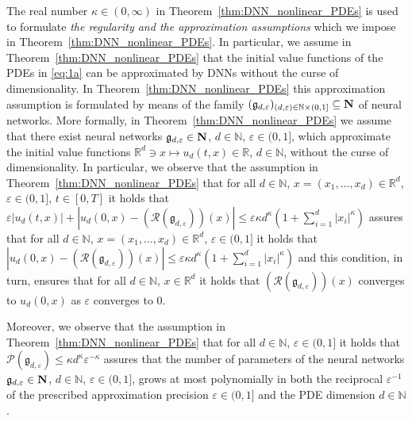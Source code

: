 \documentclass[12pt]{article}
\theoremstyle{definition}
\newcommand{\R}{\mathbb{R}}
\newcommand{\N}{\mathbb{N}}
\begin{document}
The real number $ \kappa \in (0,\infty) $ 
in Theorem~\ref{thm:DNN_nonlinear_PDEs}  
is used to formulate 
\emph{the regularity and 
the approximation assumptions} 
which we impose in Theorem~\ref{thm:DNN_nonlinear_PDEs}. 
In particular, we assume in Theorem~\ref{thm:DNN_nonlinear_PDEs} 
that the initial value functions of the PDEs in \eqref{eq:1a} 
can be approximated by DNNs without the curse of dimensionality. 
In Theorem~\ref{thm:DNN_nonlinear_PDEs} this approximation assumption 
is formulated by means of the family 
$ 
  (\mathfrak{g}_{d,\varepsilon} )_{ (d,\varepsilon) \in \N \times (0,1] } 
  \subseteq {\bf N} 
$
of neural networks. 
More formally, 
in Theorem~\ref{thm:DNN_nonlinear_PDEs} 
we assume that there exist neural networks   
$ \mathfrak{g}_{d,\varepsilon} \in {\bf N} $,
$ 
  d \in \N 
$,
$
  \varepsilon \in (0,1] 
$,
which approximate 
the initial value functions 
$ 
  \R^d \ni x \mapsto u_d( t, x ) \in \R 
$,
$ d \in \N $, 
without the curse of dimensionality. 
In particular, we observe that the assumption 
in Theorem~\ref{thm:DNN_nonlinear_PDEs} that 
for all 
$ d \in \N $, $ x = (x_1, \dots, x_d) \in \R^d $, 
$ \varepsilon \in (0,1] $, $ t \in [0,T] $ 
it holds that
$ 
  \varepsilon | u_d(t,x) | 
  + \allowbreak 
  | u_d(0,x) \allowbreak - ( \mathcal{R}(\mathfrak{g}_{d,\varepsilon}) )(x) | 
  \le \varepsilon \kappa d^\kappa (1 + \sum_{ i = 1 }^d | x_i |^\kappa ) 
$
assures that 
for all 
$ d \in \N $, $ x = (x_1, \dots, x_d) \in \R^d $, 
$ \varepsilon \in (0,1] $
it holds that
$ 
  | u_d(0,x) \allowbreak - ( \mathcal{R}(\mathfrak{g}_{d,\varepsilon}) )(x) | 
  \le \varepsilon \kappa d^\kappa (1 + \sum_{ i = 1 }^d | x_i |^\kappa ) 
$
and this condition, in turn, ensures 
that for all $ d \in \N $, $ x \in \R^d $ 
it holds that 
$
  ( \mathcal{R}(\mathfrak{g}_{d,\varepsilon}) )(x)
$
converges to 
$
  u_d(0,x)
$
as 
$ \varepsilon $
converges to $ 0 $. 



Moreover, we observe that the assumption 
in Theorem~\ref{thm:DNN_nonlinear_PDEs} that 
for all $ d \in \N $, 
$ \varepsilon \in (0,1] $
it holds that 
$
  \mathcal{P}(\mathfrak{g}_{d,\varepsilon}) \le \kappa d^\kappa \varepsilon^{-\kappa} 
$
assures that the number of parameters 
of the neural networks 
$ \mathfrak{g}_{d,\varepsilon} \in {\bf N} $,
$ 
  d \in \N 
$,
$
  \varepsilon \in (0,1] 
$,
grows at most polynomially 
in both the reciprocal $ \varepsilon^{ - 1 } $ 
of the prescribed approximation precision 
$ \varepsilon \in (0,1] $
and the PDE dimension $ d \in \N $. 
\end{document}
